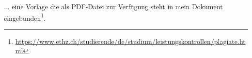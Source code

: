 
... eine Vorlage die als PDF-Datei zur Verfügung steht in mein Dokument eingebunden\footnote{\url{https://www.ethz.ch/studierende/de/studium/leistungskontrollen/plagiate.html}}.

